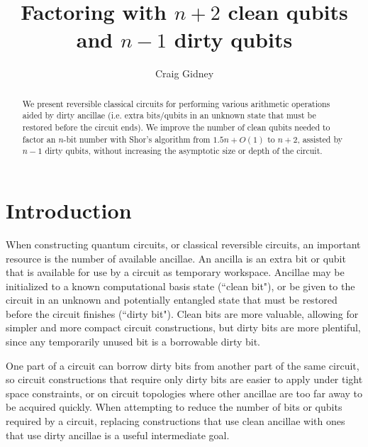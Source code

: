\documentclass[twocolumn,longbibliography]{quantumarticle-customized}
\title{Factoring with $n+2$ clean qubits and $n-1$ dirty qubits}
\author{Craig Gidney}
\affiliation{Google, Santa Barbara, CA 93117, USA}
\begin{document}
\maketitle

\begin{abstract}
We present reversible classical circuits for performing various arithmetic operations aided by dirty ancillae (i.e. extra bits/qubits in an unknown state that must be restored before the circuit ends).
We improve the number of clean qubits needed to factor an $n$-bit number with Shor's algorithm \cite{Shor1999} from $1.5n + O(1)$ \cite{zalka2006} to $n+2$, assisted by $n-1$ dirty qubits, without increasing the asymptotic size or depth of the circuit.
\end{abstract}

\section{Introduction} \label{sec:introduction}

When constructing quantum circuits, or classical reversible circuits, an important resource is the number of available ancillae.
An ancilla is an extra bit or qubit that is available for use by a circuit as temporary workspace.
Ancillae may be initialized to a known computational basis state (``clean bit"), or be given to the circuit in an unknown and potentially entangled state that must be restored before the circuit finishes (``dirty bit").
Clean bits are more valuable, allowing for simpler and more compact circuit constructions, but dirty bits are more plentiful, since any temporarily unused bit is a borrowable dirty bit.

One part of a circuit can borrow dirty bits from another part of the same circuit, so circuit constructions that require only dirty bits are easier to apply under tight space constraints, or on circuit topologies where other ancillae are too far away to be acquired quickly.
When attempting to reduce the number of bits or qubits required by a circuit, replacing constructions that use clean ancillae with ones that use dirty ancillae is a useful intermediate goal.
\end{document}
